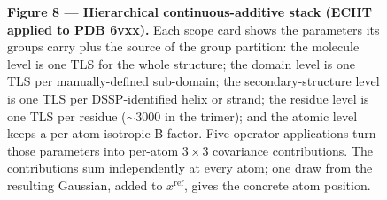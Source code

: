 \documentclass[11pt]{article}
\begin{document}
\begin{figure}[p]
\vspace{0.6em}

\footnotesize\textbf{Figure 8 — Hierarchical continuous-additive stack
(ECHT applied to PDB 6vxx).} Each scope card shows the parameters its
groups carry plus the source of the group partition: the molecule level is
one TLS for the whole structure; the domain level is one TLS per
manually-defined sub-domain; the secondary-structure level is one TLS per
DSSP-identified helix or strand; the residue level is one TLS per residue
($\sim$3000 in the trimer); and the atomic level keeps a per-atom
isotropic B-factor. Five operator applications turn those parameters into
per-atom $3{\times}3$ covariance contributions. The contributions sum
independently at every atom; one draw from the resulting Gaussian, added
to $x^{\text{ref}}$, gives the concrete atom position.
\end{figure}\clearpage
\end{document}
